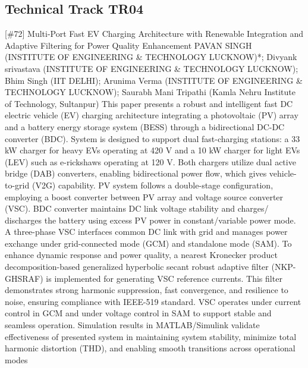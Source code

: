 \clearpage \subsection{Technical Track TR04}\nopagebreak {} \begin{abstract_online} {[\#72] Multi-Port Fast EV Charging Architecture with Renewable Integration and Adaptive Filtering for Power Quality Enhancement } {} {PAVAN SINGH (INSTITUTE OF ENGINEERING \& TECHNOLOGY LUCKNOW)*; Divyank srivastava (INSTITUTE OF ENGINEERING \& TECHNOLOGY LUCKNOW); Bhim Singh (IIT DELHI); Arunima  Verma (INSTITUTE OF ENGINEERING \& TECHNOLOGY LUCKNOW); Saurabh Mani Tripathi (Kamla Nehru Institute of Technology, Sultanpur)} {} This paper presents a robust and intelligent fast DC electric vehicle (EV) charging architecture integrating a photovoltaic (PV) array and a battery energy storage system (BESS) through a bidirectional DC-DC converter (BDC). System is designed to support dual fast-charging stations: a 33 kW charger for heavy EVs operating at 420 V and a 10 kW charger for light EVs (LEV) such as e-rickshaws operating at 120 V. Both chargers utilize dual active bridge (DAB) converters, enabling bidirectional power flow, which gives vehicle-to-grid (V2G) capability. PV system follows a double-stage configuration, employing a boost converter between  PV array and voltage source converter (VSC). BDC converter maintains DC link voltage stability and charges/ discharges the battery using excess PV power in constant/variable power mode. A three-phase VSC interfaces common DC link with grid and manages power exchange under grid-connected mode (GCM) and standalone mode (SAM). To enhance dynamic response and power quality, a nearest Kronecker product decomposition-based generalized hyperbolic secant robust adaptive filter (NKP-GHSRAF) is implemented for generating VSC reference currents. This filter demonstrates strong harmonic suppression, fast convergence, and resilience to noise, ensuring compliance with IEEE-519 standard. VSC operates under current control in GCM and under voltage control in SAM to support stable and seamless operation. Simulation results in MATLAB/Simulink validate effectiveness of presented system in maintaining system stability, minimize total harmonic distortion (THD), and enabling smooth transitions across operational modes \end{abstract_online} 
